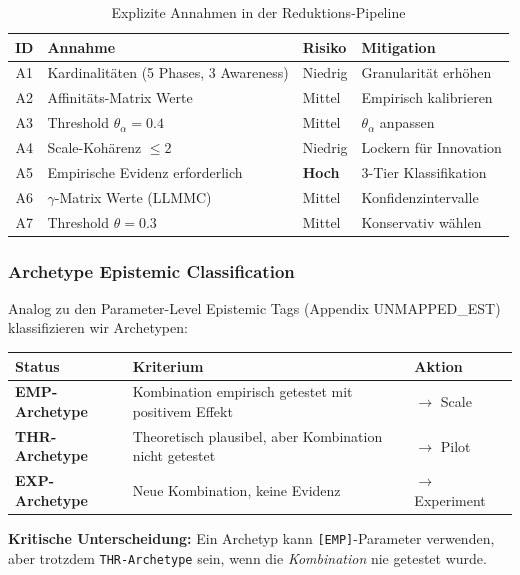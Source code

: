 \begin{table}[htbp]
\centering
\caption{Explizite Annahmen in der Reduktions-Pipeline}
\label{tab:17-assumptions}
\renewcommand{\arraystretch}{1.3}
\small
\begin{tabular}{@{}clll@{}}
\toprule
\textbf{ID} & \textbf{Annahme} & \textbf{Risiko} & \textbf{Mitigation} \\
\midrule
A1 & Kardinalitäten (5 Phases, 3 Awareness) & Niedrig & Granularität erhöhen \\
A2 & Affinitäts-Matrix Werte & Mittel & Empirisch kalibrieren \\
A3 & Threshold $\theta_\alpha = 0.4$ & Mittel & $\theta_\alpha$ anpassen \\
A4 & Scale-Kohärenz $\leq 2$ & Niedrig & Lockern für Innovation \\
A5 & Empirische Evidenz erforderlich & \textbf{Hoch} & 3-Tier Klassifikation \\
A6 & $\gamma$-Matrix Werte (LLMMC) & Mittel & Konfidenzintervalle \\
A7 & Threshold $\theta = 0.3$ & Mittel & Konservativ wählen \\
\bottomrule
\end{tabular}
\end{table}

\subsubsection{Archetype Epistemic Classification}

\begin{tcolorbox}[colback=orange!5!white, colframe=orange!75!black,
    title=\textbf{Die Drei-Tier Archetype-Klassifikation}]

Analog zu den Parameter-Level Epistemic Tags (Appendix UNMAPPED_EST) klassifizieren wir Archetypen:

\begin{center}
\renewcommand{\arraystretch}{1.3}
\begin{tabular}{@{}lp{6cm}l@{}}
\toprule
\textbf{Status} & \textbf{Kriterium} & \textbf{Aktion} \\
\midrule
\cellcolor{green!20}\textbf{EMP-Archetype} & Kombination empirisch getestet mit positivem Effekt & $\rightarrow$ Scale \\
\cellcolor{blue!20}\textbf{THR-Archetype} & Theoretisch plausibel, aber Kombination nicht getestet & $\rightarrow$ Pilot \\
\cellcolor{orange!20}\textbf{EXP-Archetype} & Neue Kombination, keine Evidenz & $\rightarrow$ Experiment \\
\bottomrule
\end{tabular}
\end{center}

\textbf{Kritische Unterscheidung:} Ein Archetyp kann \texttt{[EMP]}-Parameter verwenden, aber trotzdem \texttt{THR-Archetype} sein, wenn die \textit{Kombination} nie getestet wurde.

\end{tcolorbox}

